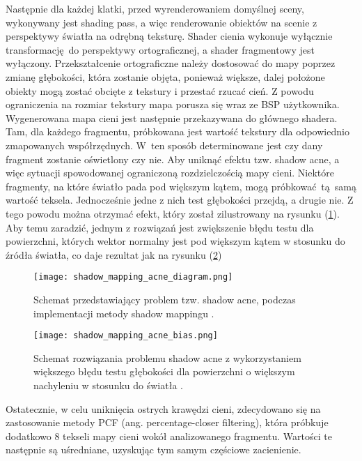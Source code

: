 Następnie dla każdej klatki, przed wyrenderowaniem domyślnej sceny, wykonywany jest shading pass, a więc renderowanie obiektów na scenie z perspektywy światła na odrębną teksturę. Shader cienia wykonuje wyłącznie transformację do perspektywy ortograficznej, a shader fragmentowy jest wyłączony. Przekształcenie ortograficzne należy dostosować do mapy poprzez zmianę głębokości, która zostanie objęta, ponieważ większe, dalej położone obiekty mogą zostać obcięte z tekstury i przestać rzucać cień. Z powodu ograniczenia na rozmiar tekstury mapa porusza się wraz ze BSP użytkownika. 
\\

Wygenerowana mapa cieni jest następnie przekazywana do głównego shadera. Tam, dla każdego fragmentu, próbkowana jest wartość tekstury dla odpowiednio zmapowanych współrzędnych. W~ten sposób determinowane jest czy dany fragment zostanie oświetlony czy nie. 
Aby uniknąć efektu tzw. shadow acne, a więc sytuacji spowodowanej ograniczoną rozdzielczością mapy cieni. Niektóre fragmenty, na które światło pada pod większym kątem, mogą próbkować tą samą wartość teksela. Jednocześnie jedne z nich test głębokości przejdą, a drugie nie. Z tego powodu można otrzymać efekt, który został zilustrowany na rysunku (\ref{shadow_mapping_acne_diagram}). Aby temu zaradzić, jednym z rozwiązań jest zwiększenie błędu testu dla powierzchni, których wektor normalny jest pod większym kątem w stosunku do źródła światła, co daje rezultat jak na rysunku (\ref{shadow_mapping_acne_bias})
\\

\begin{figure}[h]
	\centering
	\texttt{[image: shadow\_mapping\_acne\_diagram.png]}
	\caption{Schemat przedstawiający problem tzw. shadow acne, podczas implementacji metody shadow mappingu \cite{learnopengl}.}
	\label{shadow_mapping_acne_diagram}
\end{figure}

\begin{figure}[h]
\centering
\texttt{[image: shadow\_mapping\_acne\_bias.png]}
\caption{Schemat rozwiązania problemu shadow acne z wykorzystaniem większego błędu testu głębokości dla powierzchni o większym nachyleniu w stosunku do światła \cite{learnopengl}.}
\label{shadow_mapping_acne_bias}
\end{figure}

Ostatecznie, w celu uniknięcia ostrych krawędzi cieni, zdecydowano się na zastosowanie metody PCF (ang. percentage-closer filtering), która próbkuje dodatkowo 8 tekseli mapy cieni wokół analizowanego fragmentu. Wartości te następnie są uśredniane, uzyskując tym samym częściowe zacienienie.

